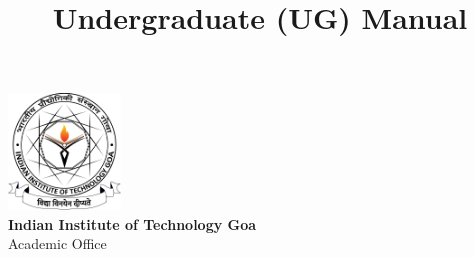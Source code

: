 \title{\fontsize{48pt}{60pt} \selectfont \color{blue} Undergraduate (UG) Manual}
\date{}
\author{}

\maketitle

\vspace{10cm}


\begin{center}
    \includegraphics[width=3cm]{Media/IIT-Goa-Logo-Black-on-White.png}\\
    \textbf{Indian Institute of Technology Goa}\\
    Academic Office
\end{center}